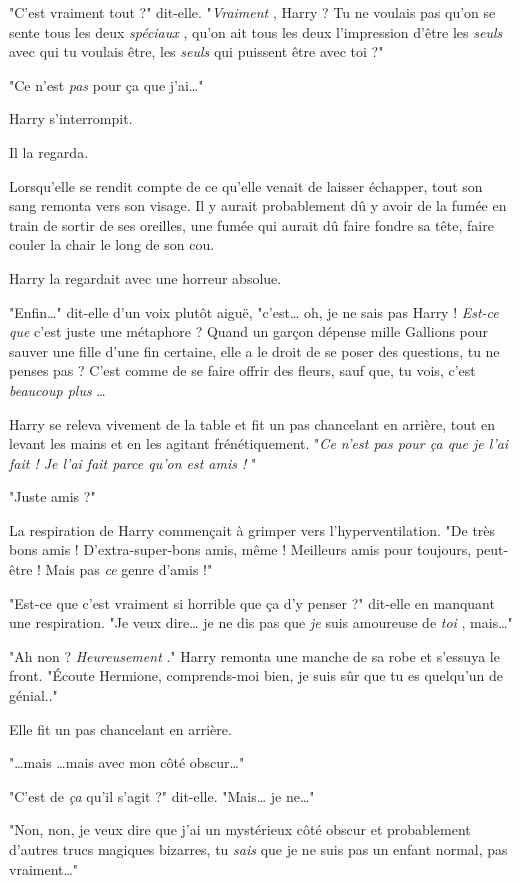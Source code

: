"C'est vraiment tout ?" dit-elle. "\emph{Vraiment} , Harry ? Tu ne voulais pas qu'on se sente tous les deux \emph{spéciaux} , qu'on ait tous les deux l'impression d'être les \emph{seuls}  avec qui tu voulais être, les \emph{seuls}  qui puissent être avec toi ?"

"Ce n'est \emph{pas}  pour ça que j'ai…"

Harry s'interrompit.

Il la regarda.

Lorsqu'elle se rendit compte de ce qu'elle venait de laisser échapper, tout son sang remonta vers son visage. Il y aurait probablement dû y avoir de la fumée en train de sortir de ses oreilles, une fumée qui aurait dû faire fondre sa tête, faire couler la chair le long de son cou.

Harry la regardait avec une horreur absolue.

"Enfin…" dit-elle d'un voix plutôt aiguë, "c'est… oh, je ne sais pas Harry ! \emph{Est-ce que}  c'est juste une métaphore ? Quand un garçon dépense mille Gallions pour sauver une fille d'une fin certaine, elle a le droit de se poser des questions, tu ne penses pas ? C'est comme de se faire offrir des fleurs, sauf que, tu vois, c'est \emph{beaucoup plus} …

Harry se releva vivement de la table et fit un pas chancelant en arrière, tout en levant les mains et en les agitant frénétiquement. "\emph{Ce n'est pas pour ça que je l'ai fait ! Je l'ai fait parce qu'on est amis !} "

"Juste amis ?"

La respiration de Harry commençait à grimper vers l'hyperventilation. "De très bons amis ! D'extra-super-bons amis, même ! Meilleurs amis pour toujours, peut-être ! Mais pas \emph{ce}  genre d'amis !"

"Est-ce que c'est vraiment si horrible que ça d'y penser ?" dit-elle en manquant une respiration. "Je veux dire… je ne dis pas que \emph{je}  suis amoureuse de \emph{toi} , mais…"

"Ah non ? \emph{Heureusement} ." Harry remonta une manche de sa robe et s'essuya le front. "Écoute Hermione, comprends-moi bien, je suis sûr que tu es quelqu'un de génial.."

Elle fit un pas chancelant en arrière.

"…mais …mais avec mon côté obscur…"

"C'est de \emph{ça}  qu'il s'agit ?" dit-elle. "Mais… je ne…"

"Non, non, je veux dire que j'ai un mystérieux côté obscur et probablement d'autres trucs magiques bizarres, tu \emph{sais}  que je ne suis pas un enfant normal, pas vraiment…"

